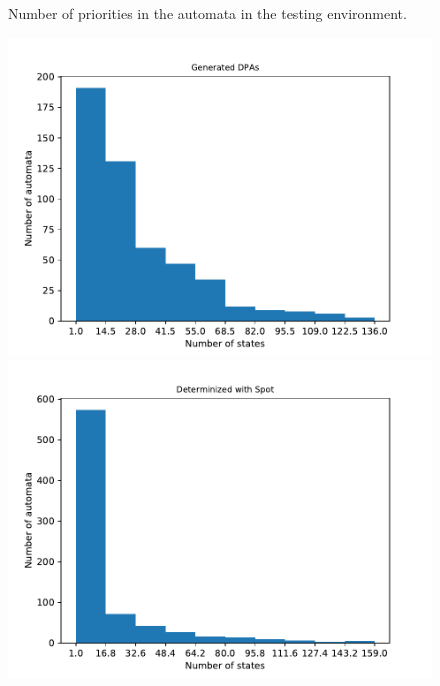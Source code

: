 \begin{figure}
\begin{minipage}{0.49\textwidth}
		\caption{Number of priorities in the automata in the testing environment.}
		\label{fig:rawstats:rawstats_prios}
	\end{minipage}
\end{figure}

\begin{figure}
	\centering
	\begin{minipage}{0.49\textwidth}
		\includegraphics[page=3,height=.3\textheight]{../data/analysis/rawstats_gendet.pdf} 
		\includegraphics[page=3,height=.3\textheight]{../data/analysis/rawstats_detspot.pdf} 

\end{minipage}
\end{figure}
